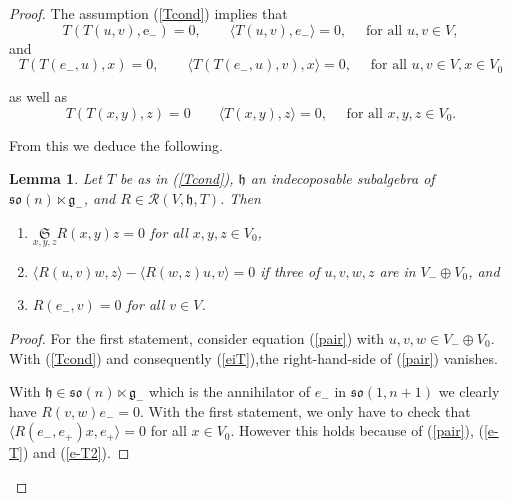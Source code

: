 \documentclass[11pt,a4paper]{amsart}
\newcommand{\g}{\mathfrak{g}}
\newcommand{\h}{\mathfrak{h}}
\newcommand{\+}{\oplus}
\newcommand{\so}{\mathfrak{so}}
\newcommand{\1}{\mathbf{1}}
\newcommand{\e}{\mathrm{e}}
\newcommand{\<}{\langle}
\renewcommand{\>}{\rangle}
\theoremstyle{definition}
\theoremstyle{plain}
\newtheorem{lemma}[definition]{Lemma}
\numberwithin{equation}{section}
\begin{document}
\begin{proof}
The assumption (\ref{Tcond})
 implies that 
\begin{equation}\label{e-T}
T(T(u,v),\e_-)=0,\qquad \<T(u,v),e_-\>=0,\quad \text{ for all }u,v\in V,
\end{equation}
and 
\begin{equation}\label{e-T2}
T(T(e_-,u),x)=0,\qquad \<T(T(e_-,u),v),x\>=0,\quad \text{ for all }u,v\in V, x\in V_0
\end{equation}

as well as 
\begin{equation}\label{eiT}
T(T(x,y),z)= 0\qquad\< T(x,y),z\>=0,\quad \text{ for all }x,y,z\in V_0.
\end{equation}

From this we deduce the following.
\begin{lemma}\label{symlemma}
Let $T$ be as in (\ref{Tcond}), $\h$ an indecoposable subalgebra of $\so(n)\ltimes \g_-$, and $R\in\mathcal R(V,\h,T)$.
Then 
\begin{enumerate}
\item $\underset{x,y,z}{\mathfrak{S}} R(x,y)z=0$ for all $x,y,z\in V_0$,
\item $\< R(u,v)w,z\>-\< R(w,z)u,v\>=0$ if three of $u,v,w,z$ are in $V_-\+V_0$, and
\item  $R(e_-,v)=0$ for all $v\in V$.
\end{enumerate}
\end{lemma}
\begin{proof} 
For the first statement, consider equation (\ref{pair}) with $u,v,w\in V_-\+V_0$. With (\ref{Tcond}) and consequently (\ref{eiT}),the right-hand-side of  (\ref{pair}) vanishes.

With $\h\in \so(n)\ltimes \g_-$ which is the annihilator of $e_-$ in $\so(1,n+1)$ we clearly have $R(v,w)e_-=0$. With the first statement, we only have to check that $ 
\<R(e_-,e_+)x,e_+\>=0$ for all $x\in V_0$. However this holds because of   (\ref{pair}), (\ref{e-T}) and (\ref{e-T2}).
\end{proof}


\end{proof}
\end{document}

